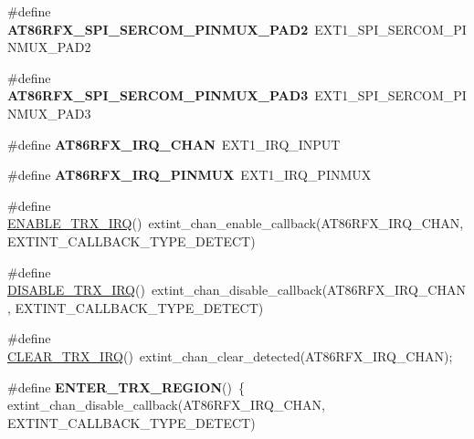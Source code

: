 \begin{DoxyCompactItemize}
\item 
\hypertarget{group__saml21__xplained__pro__features__group_gaeed3fcc3f0aebb0c50de4b519e2ccf6e}{}\#define {\bfseries A\+T86\+R\+F\+X\+\_\+\+S\+P\+I\+\_\+\+S\+E\+R\+C\+O\+M\+\_\+\+P\+I\+N\+M\+U\+X\+\_\+\+P\+A\+D2}~E\+X\+T1\+\_\+\+S\+P\+I\+\_\+\+S\+E\+R\+C\+O\+M\+\_\+\+P\+I\+N\+M\+U\+X\+\_\+\+P\+A\+D2\label{group__saml21__xplained__pro__features__group_gaeed3fcc3f0aebb0c50de4b519e2ccf6e}

\item 
\hypertarget{group__saml21__xplained__pro__features__group_ga0b78192d3c3fc085a26035ccfa5571dc}{}\#define {\bfseries A\+T86\+R\+F\+X\+\_\+\+S\+P\+I\+\_\+\+S\+E\+R\+C\+O\+M\+\_\+\+P\+I\+N\+M\+U\+X\+\_\+\+P\+A\+D3}~E\+X\+T1\+\_\+\+S\+P\+I\+\_\+\+S\+E\+R\+C\+O\+M\+\_\+\+P\+I\+N\+M\+U\+X\+\_\+\+P\+A\+D3\label{group__saml21__xplained__pro__features__group_ga0b78192d3c3fc085a26035ccfa5571dc}

\item 
\hypertarget{group__saml21__xplained__pro__features__group_ga59510bd28b7214b82000a06004731a8d}{}\#define {\bfseries A\+T86\+R\+F\+X\+\_\+\+I\+R\+Q\+\_\+\+C\+H\+A\+N}~E\+X\+T1\+\_\+\+I\+R\+Q\+\_\+\+I\+N\+P\+U\+T\label{group__saml21__xplained__pro__features__group_ga59510bd28b7214b82000a06004731a8d}

\item 
\hypertarget{group__saml21__xplained__pro__features__group_ga64f579efeb48640056d9e2ddc9702a3b}{}\#define {\bfseries A\+T86\+R\+F\+X\+\_\+\+I\+R\+Q\+\_\+\+P\+I\+N\+M\+U\+X}~E\+X\+T1\+\_\+\+I\+R\+Q\+\_\+\+P\+I\+N\+M\+U\+X\label{group__saml21__xplained__pro__features__group_ga64f579efeb48640056d9e2ddc9702a3b}

\item 
\#define \hyperlink{group__saml21__xplained__pro__features__group_ga8552a5a8c813e41b26a578bfde4652d1}{E\+N\+A\+B\+L\+E\+\_\+\+T\+R\+X\+\_\+\+I\+R\+Q}()~extint\+\_\+chan\+\_\+enable\+\_\+callback(A\+T86\+R\+F\+X\+\_\+\+I\+R\+Q\+\_\+\+C\+H\+A\+N, E\+X\+T\+I\+N\+T\+\_\+\+C\+A\+L\+L\+B\+A\+C\+K\+\_\+\+T\+Y\+P\+E\+\_\+\+D\+E\+T\+E\+C\+T)
\item 
\#define \hyperlink{group__saml21__xplained__pro__features__group_gab49d5c31d1feeaf423b2b303f3bef6cf}{D\+I\+S\+A\+B\+L\+E\+\_\+\+T\+R\+X\+\_\+\+I\+R\+Q}()~extint\+\_\+chan\+\_\+disable\+\_\+callback(A\+T86\+R\+F\+X\+\_\+\+I\+R\+Q\+\_\+\+C\+H\+A\+N, E\+X\+T\+I\+N\+T\+\_\+\+C\+A\+L\+L\+B\+A\+C\+K\+\_\+\+T\+Y\+P\+E\+\_\+\+D\+E\+T\+E\+C\+T)
\item 
\#define \hyperlink{group__saml21__xplained__pro__features__group_gabb7258badbff68701ce350d608efe151}{C\+L\+E\+A\+R\+\_\+\+T\+R\+X\+\_\+\+I\+R\+Q}()~extint\+\_\+chan\+\_\+clear\+\_\+detected(A\+T86\+R\+F\+X\+\_\+\+I\+R\+Q\+\_\+\+C\+H\+A\+N);
\item 
\hypertarget{group__saml21__xplained__pro__features__group_ga03364b3677b884617c15b752d8339e18}{}\#define {\bfseries E\+N\+T\+E\+R\+\_\+\+T\+R\+X\+\_\+\+R\+E\+G\+I\+O\+N}()~\{ extint\+\_\+chan\+\_\+disable\+\_\+callback(A\+T86\+R\+F\+X\+\_\+\+I\+R\+Q\+\_\+\+C\+H\+A\+N, E\+X\+T\+I\+N\+T\+\_\+\+C\+A\+L\+L\+B\+A\+C\+K\+\_\+\+T\+Y\+P\+E\+\_\+\+D\+E\+T\+E\+C\+T)\label{group__saml21__xplained__pro__features__group_ga03364b3677b884617c15b752d8339e18}


\end{DoxyCompactItemize}
